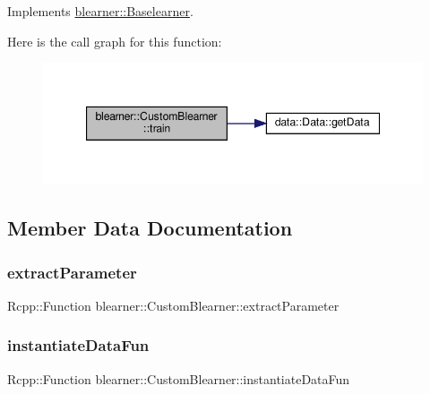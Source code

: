 Implements \hyperlink{classblearner_1_1_baselearner_a40e03ad070b9a03aae706d9ee8094b80}{blearner\+::\+Baselearner}.

Here is the call graph for this function\+:\nopagebreak
\begin{figure}[H]
\begin{center}
\leavevmode
\includegraphics[width=347pt]{classblearner_1_1_custom_blearner_a4726c5b861b67817f7b3eb61d8f6c0d7_cgraph}
\end{center}
\end{figure}


\subsection{Member Data Documentation}
\mbox{\label{classblearner_1_1_custom_blearner_a95a77720324a16190f84612ea0c0e812}} 
\subsubsection{\texorpdfstring{extract\+Parameter}{extractParameter}}
{\footnotesize\ttfamily Rcpp\+::\+Function blearner\+::\+Custom\+Blearner\+::extract\+Parameter\hspace{0.3cm}{\ttfamily [private]}}

\mbox{\label{classblearner_1_1_custom_blearner_a97bbb549bc85799ec40d3a67cb204222}} 
\subsubsection{\texorpdfstring{instantiate\+Data\+Fun}{instantiateDataFun}}
{\footnotesize\ttfamily Rcpp\+::\+Function blearner\+::\+Custom\+Blearner\+::instantiate\+Data\+Fun\hspace{0.3cm}{\ttfamily [private]}}

